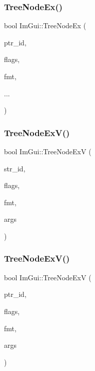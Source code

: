 \hypertarget{namespace_im_gui_adce362ad94baa9b00f5914cbcab00452}{}\label{namespace_im_gui_adce362ad94baa9b00f5914cbcab00452} 
\subsubsection{\texorpdfstring{Tree\+Node\+Ex()}{TreeNodeEx()}\hspace{0.1cm}{\footnotesize\ttfamily [3/3]}}
{\footnotesize\ttfamily bool Im\+Gui\+::\+Tree\+Node\+Ex (\begin{DoxyParamCaption}\item[{const void $\ast$}]{ptr\+\_\+id,  }\item[{Im\+Gui\+Tree\+Node\+Flags}]{flags,  }\item[{const char $\ast$}]{fmt,  }\item[{}]{... }\end{DoxyParamCaption})}

\hypertarget{namespace_im_gui_a251cd4acbdad4cef2246d9b573a83ce0}{}\label{namespace_im_gui_a251cd4acbdad4cef2246d9b573a83ce0} 
\subsubsection{\texorpdfstring{Tree\+Node\+Ex\+V()}{TreeNodeExV()}\hspace{0.1cm}{\footnotesize\ttfamily [1/2]}}
{\footnotesize\ttfamily bool Im\+Gui\+::\+Tree\+Node\+ExV (\begin{DoxyParamCaption}\item[{const char $\ast$}]{str\+\_\+id,  }\item[{Im\+Gui\+Tree\+Node\+Flags}]{flags,  }\item[{const char $\ast$}]{fmt,  }\item[{va\+\_\+list}]{args }\end{DoxyParamCaption})}

\hypertarget{namespace_im_gui_aaae827898572d17e064a88a1afc8e6b0}{}\label{namespace_im_gui_aaae827898572d17e064a88a1afc8e6b0} 
\subsubsection{\texorpdfstring{Tree\+Node\+Ex\+V()}{TreeNodeExV()}\hspace{0.1cm}{\footnotesize\ttfamily [2/2]}}
{\footnotesize\ttfamily bool Im\+Gui\+::\+Tree\+Node\+ExV (\begin{DoxyParamCaption}\item[{const void $\ast$}]{ptr\+\_\+id,  }\item[{Im\+Gui\+Tree\+Node\+Flags}]{flags,  }\item[{const char $\ast$}]{fmt,  }\item[{va\+\_\+list}]{args }\end{DoxyParamCaption})}


